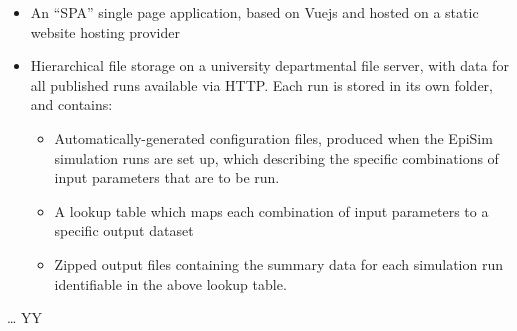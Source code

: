 \begin{itemize}
\item
  An ``SPA'' single page application, based on Vuejs and hosted on a
  static website hosting provider
\item
  Hierarchical file storage on a university departmental file server,
  with data for all published runs available via HTTP. Each run is
  stored in its own folder, and contains:

  \begin{itemize}
  \item
    Automatically-generated configuration files, produced when the
    EpiSim simulation runs are set up, which describing the specific
    combinations of input parameters that are to be run.
  \item
    A lookup table which maps each combination of input parameters to a
    specific output dataset
  \item
    Zipped output files containing the summary data for each simulation
    run identifiable in the above lookup table.
  \end{itemize}
\end{itemize}

\ldots{} YY

